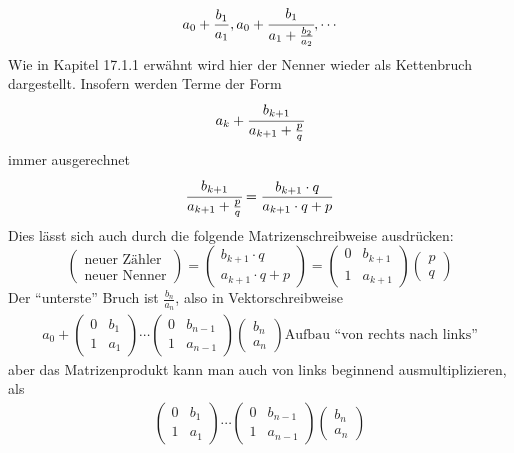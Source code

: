\begin{align*}
a_0 + \frac{b_1}{a_1} , a_0 + \cfrac{b_1}{a_1 + \frac{b_2}{a_2}} , \cdots
\end{align*}
Wie in Kapitel 17.1.1 erwähnt wird hier der Nenner wieder als Kettenbruch dargestellt.
Insofern  werden Terme der Form
\begin{align*}
a_k + \cfrac{b_{k + 1}}{a_{k + 1} + \frac{p}{q}}
\end{align*}
immer ausgerechnet
\begin{align*}
\cfrac{b_{k+1}}{a_{k+1} + \frac{p}{q}} = \frac{b_{k+1} \cdot q}{a_{k+1} \cdot q + p}
\end{align*}
Dies lässt sich auch durch die folgende Matrizenschreibweise ausdrücken:
\begin{equation}
		\begin{pmatrix}
			\textrm{neuer Zähler}\\
			\textrm{neuer Nenner}
		\end{pmatrix}
 = 		\begin{pmatrix}
			b_{k+1} \cdot q\\
			a_{k+1} \cdot q + p
		\end{pmatrix}
		=\begin{pmatrix}
			0&	b_{k+1}\\
			1&	a_{k+1}
		\end{pmatrix}
		\begin{pmatrix}
		p \\
		q
		\end{pmatrix}
\end{equation}
Der ``unterste'' Bruch ist $\frac{b_n}{a_n}$, also in Vektorschreibweise
\begin{align*}
a_0 + 	\begin{pmatrix}
			0& b_1\\
			1& a_1
		\end{pmatrix}
		\cdots
		\begin{pmatrix}
			0& b_{n-1}\\
			1& a_{n-1}
		\end{pmatrix}
		\begin{pmatrix}
			b_n\\
			a_n
		\end{pmatrix}
\textrm{Aufbau ``von rechts nach links''}
\end{align*}
aber das Matrizenprodukt kann man auch von links beginnend ausmultiplizieren, als
\begin{align*}
		\begin{pmatrix}
			0& b_1\\
			1& a_1
		\end{pmatrix}
		\cdots
		\begin{pmatrix}
			0& b_{n-1}\\
			1& a_{n-1}
		\end{pmatrix}
		\begin{pmatrix}
			b_n\\
			a_n
		\end{pmatrix}
\end{align*}

